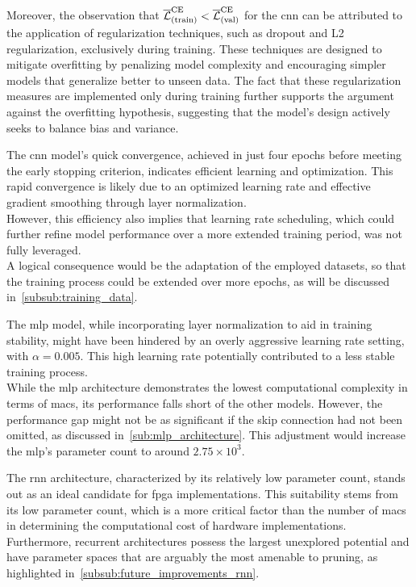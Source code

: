 Moreover, the observation that \( \overline{\mathcal{L}}_{(\text{train})}^{\text{CE}} < \overline{\mathcal{L}}_{(\text{val})}^{\text{CE}} \) for the \gls{cnn} can be attributed to the
application of regularization techniques, such as dropout and L2 regularization, exclusively during training.
These techniques are designed to mitigate overfitting by penalizing model complexity and encouraging simpler models that
generalize better to unseen data. The fact that these regularization measures are implemented only during training further
supports the argument against the overfitting hypothesis, suggesting that the model's design actively seeks to balance
bias and variance.

The \gls{cnn} model's quick convergence, achieved in just four epochs before meeting the early stopping criterion,
indicates efficient learning and optimization.
This rapid convergence is likely due to an optimized learning rate and effective gradient smoothing through layer
normalization. \\
However, this efficiency also implies that learning rate scheduling, which could further refine model performance over a
more extended training period, was not fully leveraged. \\
A logical consequence would be the adaptation of the employed datasets, so that the training process could be extended
over more epochs, as will be discussed in~\autoref{subsub:training_data}.

The \gls{mlp} model, while incorporating layer normalization to aid in training stability, might have been hindered by
an overly aggressive learning rate setting, with \( \alpha = 0.005 \). This high learning rate potentially contributed to
a less stable training process. \\
While the \gls{mlp} architecture demonstrates the lowest computational complexity in terms of \glspl{mac}, its performance
falls short of the other models. However, the performance gap might not be as significant if the skip connection had not
been omitted, as discussed in~\autoref{sub:mlp_architecture}. This adjustment would increase the \gls{mlp}'s parameter
count to around \( 2.75 \times 10^3 \).

The \gls{rnn} architecture, characterized by its relatively low parameter count, stands out as an ideal candidate for
\gls{fpga} implementations. This suitability stems from its low parameter count, which is a more critical factor than the number of \glspl{mac} in
determining the computational cost of hardware implementations. \\
Furthermore, recurrent architectures possess the largest unexplored potential and have parameter spaces that are arguably
the most amenable to pruning, as highlighted in~\autoref{subsub:future_improvements_rnn}.

